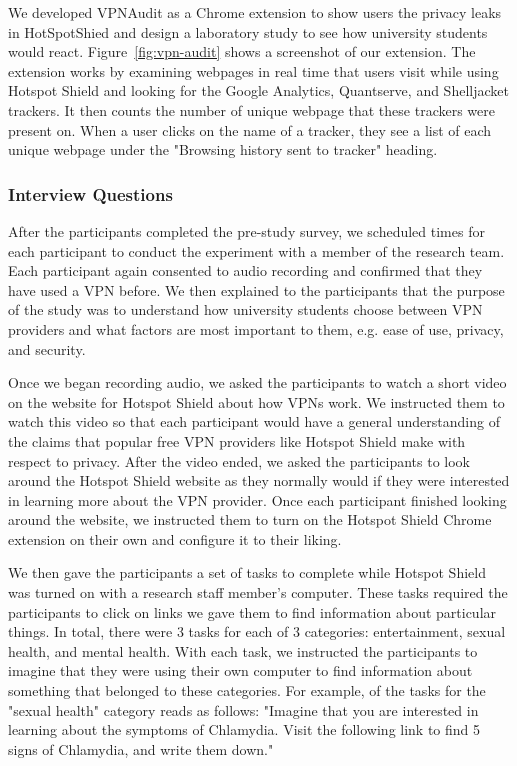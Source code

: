 We developed VPNAudit as a Chrome extension to show users the privacy leaks in HotSpotShied and design a laboratory study to see how university students would react.
Figure~\ref{fig:vpn-audit} shows a screenshot of our extension.
The extension works by examining webpages in real time that users visit while using Hotspot Shield and looking for the Google Analytics, Quantserve, and Shelljacket trackers.
It then counts the number of unique webpage that these trackers were present on.
When a user clicks on the name of a tracker, they see a list of each unique webpage under the "Browsing history sent to tracker" heading. 

\subsubsection{Interview Questions}
After the participants completed the pre-study survey, we scheduled times for each participant to conduct the experiment with a member of the research team.
Each participant again consented to audio recording and confirmed that they have used a VPN before.
We then explained to the participants that the purpose of the study was to understand how university students choose between VPN providers and what factors are most important to them, e.g. ease of use, privacy, and security.

Once we began recording audio, we asked the participants to watch a short video on the website for Hotspot Shield about how VPNs work.
We instructed them to watch this video so that each participant would have a general understanding of the claims that popular free VPN providers like Hotspot Shield make with respect to privacy.
After the video ended, we asked the participants to look around the Hotspot Shield website as they normally would if they were interested in learning more about the VPN provider.
Once each participant finished looking around the website, we instructed them to turn on the Hotspot Shield Chrome extension on their own and configure it to their liking.

We then gave the participants a set of tasks to complete while Hotspot Shield was turned on with a research staff member's computer.
These tasks required the participants to click on links we gave them to find information about particular things.
In total, there were 3 tasks for each of 3 categories: entertainment, sexual health, and mental health.
With each task, we instructed the participants to imagine that they were using their own computer to find information about something that belonged to these categories.
For example, of the tasks for the "sexual health" category reads as follows: "Imagine that you are interested in learning about the symptoms of Chlamydia. Visit the following link to find 5 signs of Chlamydia, and write them down."

